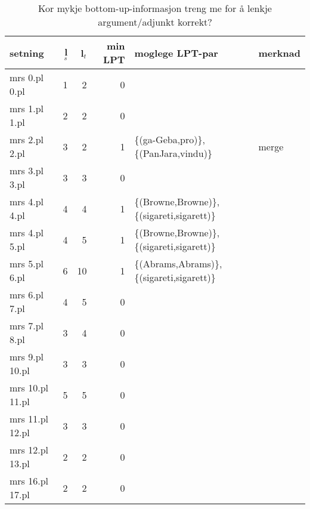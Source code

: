 \documentclass[11pt,a4paper,oneside,draft]{book}
\begin{document}
\begin{table}[htb]
\caption{\label{tbl:LPT}Kor mykje bottom-up-informasjon treng me for å lenkje argument/adjunkt korrekt?}
\begin{center}
\begin{tabular}{lrrrll}
 setning          &  l$_s$  &  l$_t$  &  min LPT  &  moglege LPT-par                               &  merknad  \\
\hline
 mrs 0.pl 0.pl    &      1  &      2  &        0  &                                                &           \\
 mrs 1.pl 1.pl    &      2  &      2  &        0  &                                                &           \\
 mrs 2.pl 2.pl    &      3  &      2  &        1  &  \{(ga-Geba,pro)\}, \{(PanJara,vindu)\}        &  merge    \\
 mrs 3.pl 3.pl    &      3  &      3  &        0  &                                                &           \\
 mrs 4.pl 4.pl    &      4  &      4  &        1  &  \{(Browne,Browne)\}, \{(sigareti,sigarett)\}  &           \\
 mrs 4.pl 5.pl    &      4  &      5  &        1  &  \{(Browne,Browne)\}, \{(sigareti,sigarett)\}  &           \\
 mrs 5.pl 6.pl    &      6  &     10  &        1  &  \{(Abrams,Abrams)\}, \{(sigareti,sigarett)\}  &           \\
 mrs 6.pl 7.pl    &      4  &      5  &        0  &                                                &           \\
 mrs 7.pl 8.pl    &      3  &      4  &        0  &                                                &           \\
 mrs 9.pl 10.pl   &      3  &      3  &        0  &                                                &           \\
 mrs 10.pl 11.pl  &      5  &      5  &        0  &                                                &           \\
 mrs 11.pl 12.pl  &      3  &      3  &        0  &                                                &           \\
 mrs 12.pl 13.pl  &      2  &      2  &        0  &                                                &           \\
 mrs 16.pl 17.pl  &      2  &      2  &        0  &                                                &           \\

\end{tabular}
\end{center}
\end{table}
\end{document}
